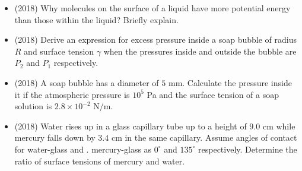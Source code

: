 \documentclass{article}
\begin{document}
\begin{itemize}
\item (2018)  Why molecules on the surface of a liquid have more potential energy than those within the liquid? Briefly explain. 
\item (2018)  Derive an expression for excess pressure inside a soap bubble of radius $ R$ and surface tension $ \gamma $ when the pressures inside and outside the bubble are $ P_{2}$ and $ P_{1}$ respectively. 
\item (2018)  A soap bubble has a diameter of $ 5$ mm. Calculate the pressure inside it if the atmospheric pressure is $ 10^{5}$ Pa and the surface tension of a soap solution is $ 2.8 \times 10^{-2}$ N$/$m.
\item (2018)  Water rises up in a glass capillary tube up to a height of $ 9.0$ cm while mercury falls down by $ 3.4$ cm in the same capillary. Assume angles of contact for water-glass and . mercury-glass as $ 0^{\circ}$ and $ 135^{\circ}$ respectively. Determine the ratio of surface tensions of mercury and water. 
\end{itemize}
\end{document}
